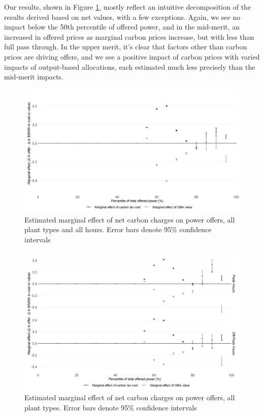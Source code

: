 \documentclass[12pt]{article}
\begin{document}
Our results, shown in Figure \ref{fig:decomp_all_hours}, mostly reflect an intuitive decomposition of the results derived based on net values, with a few exceptions. Again, we see no impact below the 50th percentile of offered power, and in the mid-merit, an increased in offered prices as marginal carbon prices increase, but with less than full pass through. In the upper merit, it's clear that factors other than carbon prices are driving offers, and we see a positive impact of carbon prices with varied impacts of output-based allocations, each estimated much less precisely than the mid-merit impacts.


\begin{figure}[!ht]
    \centering
     \includegraphics[width=.9\textwidth]{../images/all_plants_no_peaks.png}
    \caption{Estimated marginal effect of net carbon charges on power offers, all plant types and all hours. Error bars denote 95\% confidence intervals}
    \label{fig:decomp_all_hours}
\end{figure}

\begin{figure}[!ht]
    \centering
     \includegraphics[width=.9\textwidth]{../images/all_plants.png}
    \caption{Estimated marginal effect of net carbon charges on power offers, all plant types. Error bars denote 95\% confidence intervals}
    \label{fig:decomp_peaks}
\end{figure}
\end{document}
